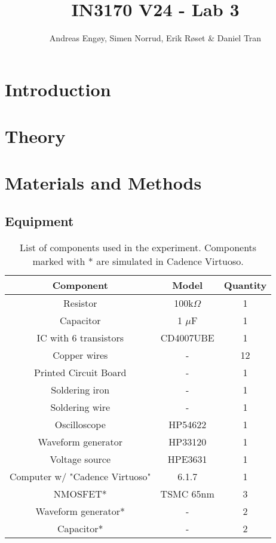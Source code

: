 \documentclass[onecolumn]{article}
\title{IN3170 V24 - Lab 3}
\author{Andreas Engøy, Simen Norrud, Erik Røset \& Daniel Tran}
\date{\monthname[\the\month] \the\year}
\begin{document}
\maketitle
\tableofcontents

\section{Introduction}

\section{Theory}

\subsection{}



\section{Materials and Methods}
\subsection{Equipment}
\begin{table}[h]
    \centering
    \begin{tabular}{|c|c|c|}
        \hline
        \textbf{Component} & \textbf{Model} & \textbf{Quantity} \\
        \hline
        Resistor & 100k$\Omega$ & 1 \\
        Capacitor & 1 $\mu$F & 1 \\
        IC with 6 transistors & CD4007UBE & 1 \\
        Copper wires & - & 12 \\
        Printed Circuit Board & - & 1 \\
        Soldering iron & - & 1 \\
        Soldering wire & - & 1 \\
        Oscilloscope & HP54622 & 1 \\
        Waveform generator  & HP33120 & 1 \\
        Voltage source & HPE3631 & 1 \\
        Computer w/ "Cadence Virtuoso" & 6.1.7 & 1 \\
        NMOSFET* & TSMC 65nm & 3 \\
        Waveform generator* & - & 2 \\ 
        Capacitor* & - & 2 \\
        \hline
    \end{tabular}
    \caption{List of components used in the experiment. Components marked with * are simulated in Cadence Virtuoso.}
    \label{tab:bom}
\end{table}
\end{document}
